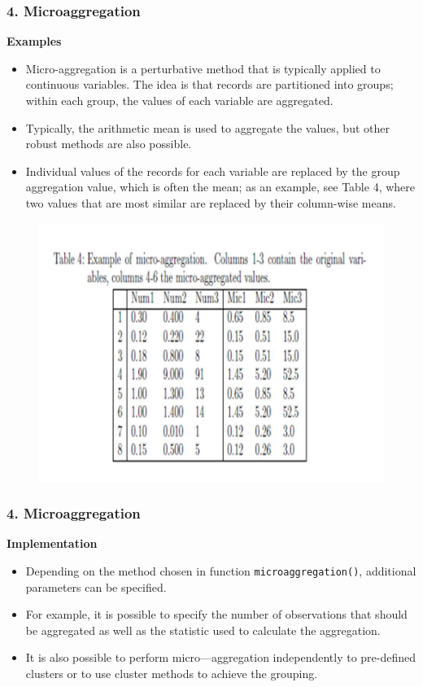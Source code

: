 \documentclass{beamer}
\begin{document}
\begin{frame}
	\frametitle{4. Microaggregation}
	\textbf{Examples}\\
	\begin{itemize}

\item Micro-aggregation is a perturbative method that is typically applied to continuous
variables. The idea is that records are partitioned into groups; within each group,
the values of each variable are aggregated. 
\item Typically, the arithmetic mean is used
to aggregate the values, but other robust methods are also possible. 
\item Individual
values of the records for each variable are replaced by the group aggregation value,
which is often the mean; as an example, see Table 4, where two values that are
most similar are replaced by their column-wise means.

\end{itemize}
\end{frame}
\begin{frame}
\begin{figure}
\centering
\includegraphics[width=0.89\linewidth]{TemplJPGs2/Slide3}
\end{figure}

\end{frame}
\begin{frame}
	\frametitle{4. Microaggregation}
\textbf{Implementation}
	\begin{itemize}
		
\item Depending on the method chosen in function \texttt{microaggregation()}, additional
parameters can be specified. 
\item For example, it is possible to specify the number of
observations that should be aggregated as well as the statistic used to calculate
the aggregation. 
\item It is also possible to perform micro—aggregation independently to
pre-defined clusters or to use cluster methods to achieve the grouping.

\end{itemize}
\end{frame}
\end{document}
